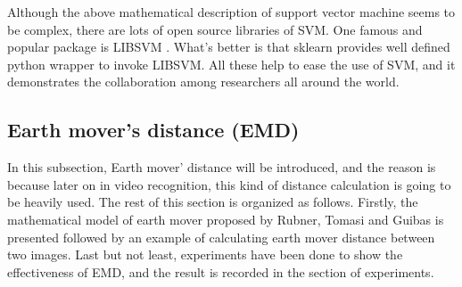     \begin{table}[!ht]
        \begin{center}
        \end{center}
        \caption{Kernel functions}
    \end{table}

  \noindent Although the above mathematical description of support vector machine seems to be complex, there are lots of open source libraries of SVM. One famous and popular package is LIBSVM \cite{CC01a}. What's better is that sklearn \cite{scikit-learn} provides well defined python wrapper to invoke LIBSVM. All these help to ease the use of SVM, and it demonstrates the collaboration among researchers all around the world.

\subsection{Earth mover's distance (EMD)}
In this subsection, Earth mover' distance will be introduced, and the reason is because later on in video recognition, this kind of distance calculation is going to be heavily used. The rest of this section is organized as follows. Firstly, the mathematical model of earth mover proposed by Rubner, Tomasi and Guibas \cite{rubner2000earth} is presented followed by an example of calculating earth mover distance between two images. Last but not least, experiments have been done to show the effectiveness of EMD, and the result is recorded in the section of experiments.\\

